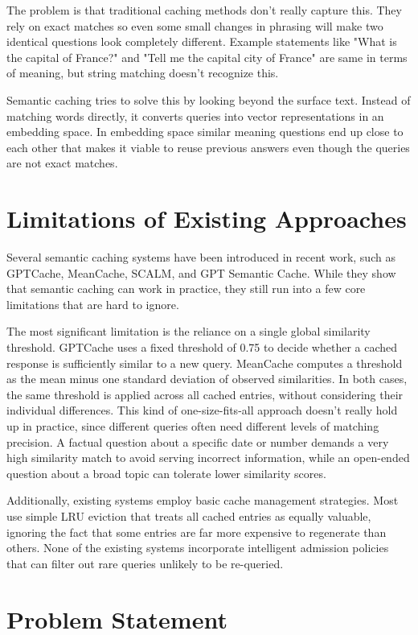 \documentclass[12pt,a4paper]{report}
\begin{document}
The problem is that traditional caching methods don’t really capture this. They rely on exact matches so even some small changes in phrasing will make two identical questions look completely different. Example statements like "What is the capital of France?" and "Tell me the capital city of France" are same in terms of meaning, but string matching doesn't recognize this.

Semantic caching tries to solve this by looking beyond the surface text. Instead of matching words directly, it converts queries into vector representations in an embedding space. In embedding space similar meaning questions end up close to each other that makes it viable to reuse previous answers even though the queries are not exact matches.


\section{Limitations of Existing Approaches}

Several semantic caching systems have been introduced in recent work, such as GPTCache, MeanCache, SCALM, and GPT Semantic Cache. While they show that semantic caching can work in practice, they still run into a few core limitations that are hard to ignore.

The most significant limitation is the reliance on a single global similarity threshold. GPTCache uses a fixed threshold of 0.75 to decide whether a cached response is sufficiently similar to a new query. MeanCache computes a threshold as the mean minus one standard deviation of observed similarities. In both cases, the same threshold is applied across all cached entries, without considering their individual differences. This kind of one-size-fits-all approach doesn’t really hold up in practice, since different queries often need different levels of matching precision. A factual question about a specific date or number demands a very high similarity match to avoid serving incorrect information, while an open-ended question about a broad topic can tolerate lower similarity scores.

Additionally, existing systems employ basic cache management strategies. Most use simple LRU eviction that treats all cached entries as equally valuable, ignoring the fact that some entries are far more expensive to regenerate than others. None of the existing systems incorporate intelligent admission policies that can filter out rare queries unlikely to be re-queried.

\section{Problem Statement}
\end{document}

